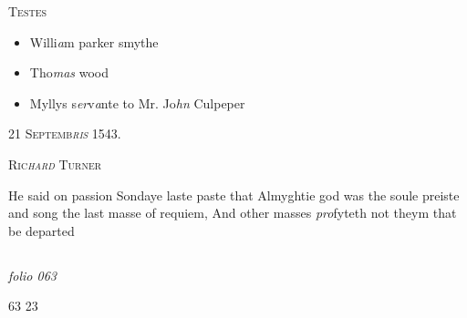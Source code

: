 \documentclass[12pt, a4paper]{book}
\begin{document}
	\begin{center} {\scshape Testes} \end{center}\begin{itemize}
		
		\item[]Willi\textit{a}m parker smythe
		\item[]Tho\textit{mas} wood
		\item[]Myllys s\textit{er}v\textit{a}nte to Mr.
 Jo\textit{hn} Culpeper
\end{itemize}
 

            
            
               
				\begin{center} \begin{large} {\scshape 
                  21 Septemb\textit{ris} 1543.} \end{large} \end{center}
			
               
                  
				\begin{center}  {\scshape Ric\textit{hard} Turner}  \end{center}
			

               	
               		
		\ifthenelse{\isodd{\thepage}}
		{\reversemarginpar}
		{\normalmarginpar}
		 He said on passion Sondaye laste paste that
 Almyghtie god was the soule preiste and song
 the last masse of requiem, And other masses \textit{pro}fyteth
 not theym that be departed
               	


            
            
\dotfill
					  \subsection*{}  \subsection*{}

\textit{folio 063}


\begin{flushright}{\color{Mahogany}63} 23\end{flushright}
 
\end{document}
